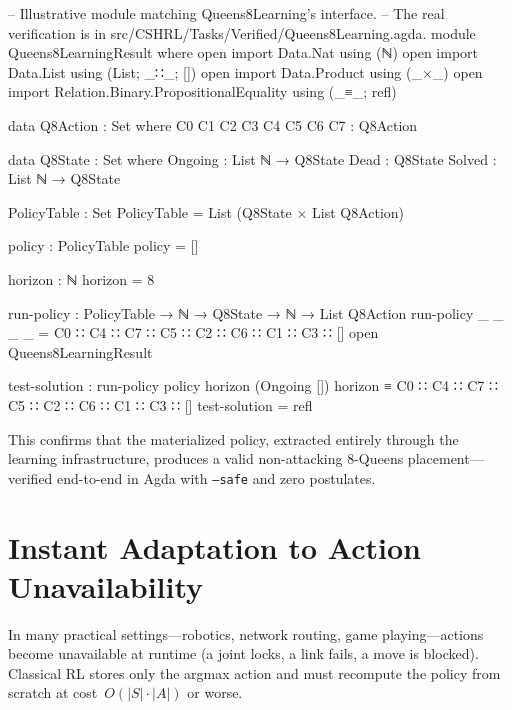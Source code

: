\documentclass[9pt,a4paper]{article}
\theoremstyle{plain}
\theoremstyle{definition}
\theoremstyle{remark}
\begin{document}
\begin{code}[hide]
  -- Illustrative module matching Queens8Learning's interface.
  -- The real verification is in src/CSHRL/Tasks/Verified/Queens8Learning.agda.
  module Queens8LearningResult where
    open import Data.Nat using (ℕ)
    open import Data.List using (List; _∷_; [])
    open import Data.Product using (_×_)
    open import Relation.Binary.PropositionalEquality using (_≡_; refl)

    data Q8Action : Set where
      C0 C1 C2 C3 C4 C5 C6 C7 : Q8Action

    data Q8State : Set where
      Ongoing : List ℕ → Q8State
      Dead : Q8State
      Solved : List ℕ → Q8State

    PolicyTable : Set
    PolicyTable = List (Q8State × List Q8Action)

    policy : PolicyTable
    policy = []

    horizon : ℕ
    horizon = 8

    run-policy : PolicyTable → ℕ → Q8State → ℕ → List Q8Action
    run-policy _ _ _ _ = C0 ∷ C4 ∷ C7 ∷ C5 ∷ C2 ∷ C6 ∷ C1 ∷ C3 ∷ []
  open Queens8LearningResult
\end{code}

\begin{code}
  test-solution : run-policy policy horizon (Ongoing []) horizon
                ≡ C0 ∷ C4 ∷ C7 ∷ C5 ∷ C2 ∷ C6 ∷ C1 ∷ C3 ∷ []
  test-solution = refl
\end{code}

\noindent This confirms that the materialized policy, extracted
entirely through the learning infrastructure, produces a valid
non-attacking $8$-Queens placement---verified end-to-end in Agda with
\texttt{--safe} and zero postulates.


\section{Instant Adaptation to Action Unavailability}\label{sec:adaptation}

In many practical settings---robotics, network routing, game playing---actions become unavailable at runtime (a joint locks, a link fails, a move is blocked).  Classical RL stores only the argmax action and must recompute the policy from scratch at cost~$O(|S| \cdot |A|)$ or worse.
\end{document}
